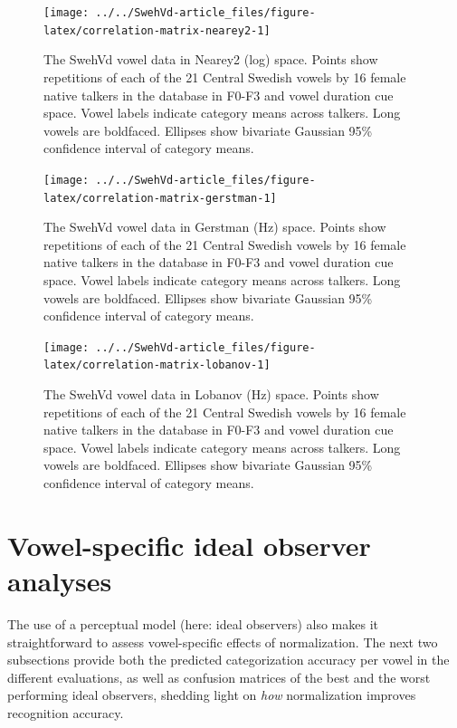 \documentclass[utf8]{frontiers_suppmat} %
\begin{document}
\begin{figure}
\texttt{[image: ../../SwehVd-article\_files/figure-latex/correlation-matrix-nearey2-1]} \caption{The SwehVd vowel data in Nearey2 (log) space. Points show repetitions of each of the 21 Central Swedish vowels by 16 female native talkers in the database in F0-F3 and vowel duration cue space. Vowel labels indicate category means across talkers. Long vowels are boldfaced. Ellipses show bivariate Gaussian 95\% confidence interval of category means.}\label{fig:correlation-matrix-nearey2}
\end{figure}



\begin{figure}
\texttt{[image: ../../SwehVd-article\_files/figure-latex/correlation-matrix-gerstman-1]} \caption{The SwehVd vowel data in Gerstman (Hz) space. Points show repetitions of each of the 21 Central Swedish vowels by 16 female native talkers in the database in F0-F3 and vowel duration cue space. Vowel labels indicate category means across talkers. Long vowels are boldfaced. Ellipses show bivariate Gaussian 95\% confidence interval of category means.}\label{fig:correlation-matrix-gerstman}
\end{figure}



\begin{figure}
\texttt{[image: ../../SwehVd-article\_files/figure-latex/correlation-matrix-lobanov-1]} \caption{The SwehVd vowel data in Lobanov (Hz) space. Points show repetitions of each of the 21 Central Swedish vowels by 16 female native talkers in the database in F0-F3 and vowel duration cue space. Vowel labels indicate category means across talkers. Long vowels are boldfaced. Ellipses show bivariate Gaussian 95\% confidence interval of category means.}\label{fig:correlation-matrix-lobanov}
\end{figure}

\newpage

\hypertarget{sec:vowel-specific}{%
\section{Vowel-specific ideal observer analyses}\label{sec:vowel-specific}}

The use of a perceptual model (here: ideal observers) also makes it straightforward to assess vowel-specific effects of normalization. The next two subsections provide both the predicted categorization accuracy per vowel in the different evaluations, as well as confusion matrices of the best and the worst performing ideal observers, shedding light on \emph{how} normalization improves recognition accuracy.
\end{document}
